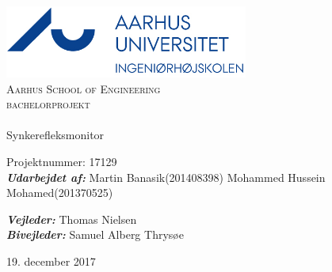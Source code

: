 
\begin{titlingpage}
\begin{center}

~ \\[3cm]

\includegraphics[width=0.6\textwidth]{figure/AU}~\\[1cm]

\textsc{\LARGE Aarhus School of Engineering}\\[1.5cm]

\textsc{\Large bachelorprojekt}\\

\noindent\makebox[\linewidth]{\rule{\textwidth}{0.4pt}}\\
[0.5cm]{\Huge Synkerefleksmonitor}
\noindent\makebox[\linewidth]{\rule{\textwidth}{0.4pt}}

\end{center}


Projektnummer: 17129 \newline\\
\textbf{\textit{Udarbejdet af:}} \newline
Martin Banasik\tab(201408398) \newline	
Mohammed Hussein Mohamed\tab(201370525) \newline	





\textbf{\textit{Vejleder:}} \newline
Thomas Nielsen\\
\textbf{\textit{Bivejleder:}} \newline
Samuel Alberg Thrysøe\\


\vfill

\begin{center}
{\large 19. december 2017}
\end{center}


\end{titlingpage}
